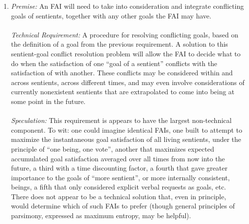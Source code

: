 \documentclass[twoside,11pt]{article}
\begin{document}
\begin{enumerate}
\item \emph{Premise:}
 An FAI will need to take into consideration and integrate conflicting goals of sentients, together with any other goals the FAI may have. \\ 
\\ 
\emph{Technical Requirement:}
 A procedure for resolving conflicting goals, based on the definition of a goal from the previous requirement. A solution to this sentient-goal conflict resolution problem will allow the FAI to decide what to do when the satisfaction of one ``goal of a sentient'' conflicts with the satisfaction of with another. These conflicts may be considered within and across sentients, across different times, and may even involve considerations of currently nonexistent sentients that are extrapolated to come into being at some point in the future. \\ 
\\ 
\emph{Speculation:}
 This requirement is appears to have the largest non-technical component. To wit: one could imagine identical FAIs, one built to attempt to maximize the instantaneous goal satisfaction of all living sentients, under the principle of ``one being, one vote'', another that maximizes expected accumulated goal satisfaction averaged over all times from now into the future, a third with a time discounting factor, a fourth that gave greater importance to the goals of ``more sentient'', or more internally consistent, beings, a fifth that only considered explicit verbal requests as goals, etc. There does not appear to be a technical solution that, even in principle, would determine which of such FAIs to prefer (though general principles of parsimony, expressed as maximum entropy, may be helpful). \\ 
\\ 
\\ 


\end{enumerate}
\end{document}
